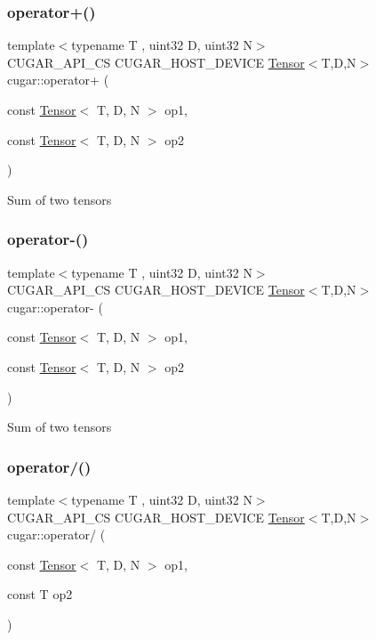 \subsubsection{\texorpdfstring{operator+()}{operator+()}}
{\footnotesize\ttfamily template$<$typename T , uint32 D, uint32 N$>$ \\
C\+U\+G\+A\+R\+\_\+\+A\+P\+I\+\_\+\+CS C\+U\+G\+A\+R\+\_\+\+H\+O\+S\+T\+\_\+\+D\+E\+V\+I\+CE \hyperlink{structcugar_1_1_tensor}{Tensor}$<$T,D,N$>$ cugar\+::operator+ (\begin{DoxyParamCaption}\item[{const \hyperlink{structcugar_1_1_tensor}{Tensor}$<$ T, D, N $>$}]{op1,  }\item[{const \hyperlink{structcugar_1_1_tensor}{Tensor}$<$ T, D, N $>$}]{op2 }\end{DoxyParamCaption})}

Sum of two tensors \mbox{\label{namespacecugar_a6862e74ffbc35f96c6f26f1e18f61cda}} 
\subsubsection{\texorpdfstring{operator-\/()}{operator-()}}
{\footnotesize\ttfamily template$<$typename T , uint32 D, uint32 N$>$ \\
C\+U\+G\+A\+R\+\_\+\+A\+P\+I\+\_\+\+CS C\+U\+G\+A\+R\+\_\+\+H\+O\+S\+T\+\_\+\+D\+E\+V\+I\+CE \hyperlink{structcugar_1_1_tensor}{Tensor}$<$T,D,N$>$ cugar\+::operator-\/ (\begin{DoxyParamCaption}\item[{const \hyperlink{structcugar_1_1_tensor}{Tensor}$<$ T, D, N $>$}]{op1,  }\item[{const \hyperlink{structcugar_1_1_tensor}{Tensor}$<$ T, D, N $>$}]{op2 }\end{DoxyParamCaption})}

Sum of two tensors \mbox{\label{namespacecugar_a4b1437e64b7ca07fd7d7c1e1b47cb93e}} 
\subsubsection{\texorpdfstring{operator/()}{operator/()}}
{\footnotesize\ttfamily template$<$typename T , uint32 D, uint32 N$>$ \\
C\+U\+G\+A\+R\+\_\+\+A\+P\+I\+\_\+\+CS C\+U\+G\+A\+R\+\_\+\+H\+O\+S\+T\+\_\+\+D\+E\+V\+I\+CE \hyperlink{structcugar_1_1_tensor}{Tensor}$<$T,D,N$>$ cugar\+::operator/ (\begin{DoxyParamCaption}\item[{const \hyperlink{structcugar_1_1_tensor}{Tensor}$<$ T, D, N $>$}]{op1,  }\item[{const T}]{op2 }\end{DoxyParamCaption})}

